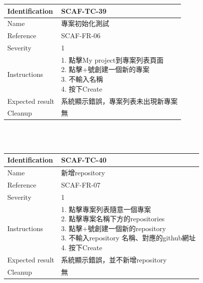 \documentclass{report}
\begin{document}
\begin{tabularx}{\textwidth}{
  |p{}%
  |p{}|%
  }
  \hline
  \centering Identification &  SCAF-TC-39 \\
  \hline
  \centering Name & 專案初始化測試 \\
  \hline
  \centering Reference & SCAF-FR-06 \\
  \hline
  \centering Severity & 1 \\
  \hline
  \centering Instructions & 
  \makecell[l]{
    1. 點擊My project到專案列表頁面  \\
    2. 點擊+號創建一個新的專案  \\
    3. 不輸入名稱  \\
    4. 按下Create
  }\\
  \hline
  \centering Expected result & 系統顯示錯誤，專案列表未出現新專案 \\
  \hline
  \centering Cleanup & 無 \\
  \hline
\end{tabularx}
\\
\newline
\\
\begin{tabularx}{\textwidth}{
  |p{}%
  |p{}|%
  }
  \hline
  \centering Identification &  SCAF-TC-40 \\
  \hline
  \centering Name & 新增repository \\
  \hline
  \centering Reference & SCAF-FR-07 \\
  \hline
  \centering Severity & 1 \\
  \hline
  \centering Instructions & 
  \makecell[l]{
    1. 點擊專案列表隨意一個專案 \\
    2. 點擊專案名稱下方的repositories \\
    3. 點擊+號創建一個新的repository \\
    3. 不輸入repository 名稱、對應的github網址  \\
    4. 按下Create
  }\\
  \hline
  \centering Expected result & 系統顯示錯誤，並不新增repository \\
  \hline
  \centering Cleanup & 無 \\
  \hline
\end{tabularx}
\\
\newline
\\
\end{document}
